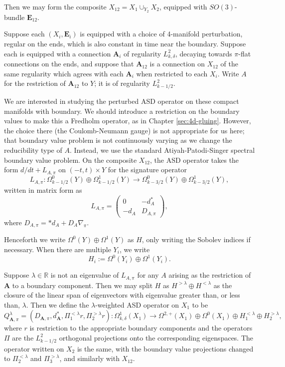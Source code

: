\documentclass[10pt,a4paper]{amsart}
\theoremstyle{definition}
\theoremstyle{remark}
\numberwithin{figure}{qchap}
\begin{document}
Then we may form the composite $X_{12} = X_1 \cup_{Y_2} X_2$, equipped with $SO(3)$-bundle $\mathbf{E}_{12}$.

Suppose each $(X_i, \mathbf{E}_i)$ is equipped with a choice of 4-manifold perturbation, regular on the ends, which is also constant in time near the boundary. Suppose each is equipped with a connection $\mathbf{A}_i$ of regularity $L^2_{k,\delta}$, decaying towards $\pi$-flat connections on the ends, and suppose that $\mathbf{A}_{12}$ is a connection on $X_{12}$ of the same regularity which agrees with each $\mathbf{A}_i$ when restricted to each $X_i$. Write $A$ for the restriction of $\mathbf{A}_{12}$ to $Y$; it is of regularity $L^2_{k-1/2}$.

We are interested in studying the perturbed ASD operator on these compact manifolds with boundary. We should introduce a restriction on the boundary values to make this a Fredholm operator, as in Chapter \ref{sec:4d-gluing}. However, the choice there (the Coulomb-Neumann gauge) is not appropriate for us here; that boundary value problem is not continuously varying as we change the reducibility type of $A$. Instead, we use the standard Atiyah-Patodi-Singer spectral boundary value problem. On the composite $X_{12}$, the ASD operator takes the form $d/dt + L_{A,\pi}$ on $(-t, t) \times Y$ for the signature operator $$L_{A,\pi}: \Omega^0_{k-1/2}(Y) \oplus \Omega^1_{k-1/2}(Y) \to \Omega^0_{k-3/2}(Y) \oplus \Omega^1_{k-3/2}(Y),$$ written in matrix form as $$L_{A,\pi} = \begin{pmatrix}0 & -d_A^* \\ -d_A & D_{A,\pi}\end{pmatrix},$$ where $D_{A,\pi} = *d_A + D_A \nabla_\pi$. 

Henceforth we write $\Omega^0(Y) \oplus \Omega^1(Y)$ as $H$, only writing the Sobolev indices if necessary. When there are multiple $Y_i$, we write $$H_i := \Omega^0(Y_i) \oplus \Omega^1(Y_i).$$

Suppose $\lambda \in \mathbb R$ is not an eigenvalue of $L_{A,\pi}$ for any $A$ arising as the restriction of $\mathbf{A}$ to a boundary component. Then we may split $H$ as $H^{>\lambda} \oplus H^{< \lambda}$ as the closure of the linear span of eigenvectors with eigenvalue greater than, or less than, $\lambda$. Then we define the $\lambda$-weighted ASD operator on $X_1$ to be 
$$Q^\lambda_{\mathbf{A},\pi} = (D_{\mathbf{A},\pi}, d^*_{\mathbf{A}}, \Pi^{< \lambda}_1r, \Pi^{> \lambda}_2r): \Omega^1_{k,\delta}(X_1) \to \Omega^{2,+}(X_1) \oplus \Omega^0(X_1) \oplus H_1^{< \lambda} \oplus H_2^{> \lambda},$$ 
where $r$ is restriction to the appropriate boundary components and the operators $\Pi$ are the $L^2_{k-1/2}$ orthogonal projections onto the corresponding eigenspaces. The operator written on $X_2$ is the same, with the boundary value projections changed to $\Pi^{<\lambda}_2$ and $\Pi^{> \lambda}_3$, and similarly with $X_{12}$.
\end{document}
